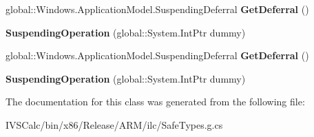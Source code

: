 \begin{DoxyCompactItemize}
global\+::\+Windows.\+Application\+Model.\+Suspending\+Deferral {\bfseries Get\+Deferral} ()
\item 
\mbox{\label{class_windows_1_1_application_model_1_1_suspending_operation_ab12572e0d9885edab7590593035bec3e}} 
{\bfseries Suspending\+Operation} (global\+::\+System.\+Int\+Ptr dummy)
\item 
\mbox{\label{class_windows_1_1_application_model_1_1_suspending_operation_a1f4d948032ca90ae856b6738a62dddcc}} 
global\+::\+Windows.\+Application\+Model.\+Suspending\+Deferral {\bfseries Get\+Deferral} ()
\item 
\mbox{\label{class_windows_1_1_application_model_1_1_suspending_operation_ab12572e0d9885edab7590593035bec3e}} 
{\bfseries Suspending\+Operation} (global\+::\+System.\+Int\+Ptr dummy)
\end{DoxyCompactItemize}


The documentation for this class was generated from the following file\+:\begin{DoxyCompactItemize}
\item 
I\+V\+S\+Calc/bin/x86/\+Release/\+A\+R\+M/ilc/Safe\+Types.\+g.\+cs\end{DoxyCompactItemize}
